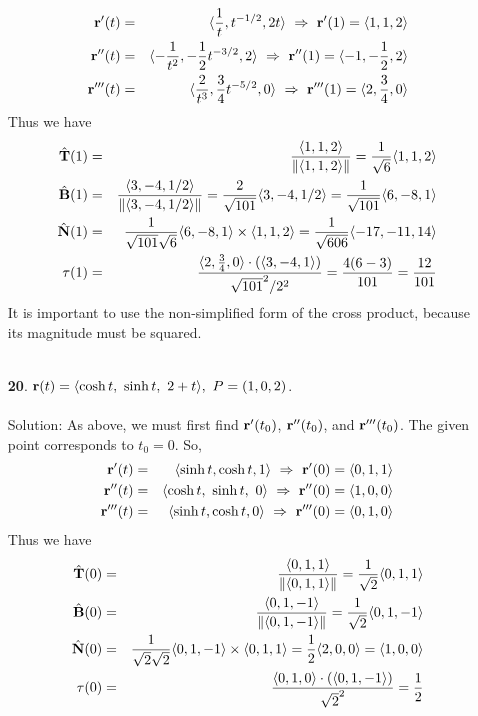 \documentclass[12pt]{amsbook}
\newcommand{\la}{\langle}
\newcommand{\ra}{\rangle}
\begin{document}
\begin{enumerate}
  \begin{eqnarray*}
  {\bf r}'(t)&=&\la \frac{1}{t},t^{-1/2},2t \ra \ \Rightarrow \ {\bf r}'(1)=\la 1,1,2 \ra \\
  {\bf r}''(t)&=&\la -\frac{1}{t^2},-\frac{1}{2}t^{-3/2},2 \ra \ \Rightarrow \ {\bf r}''(1)=\la -1,-\frac{1}{2},2 \ra \\
  {\bf r}'''(t)&=&\la \frac{2}{t^3},\frac{3}{4}t^{-5/2},0 \ra  \ \Rightarrow \ {\bf r}'''(1)=\la 2,\frac{3}{4},0 \ra
  \end{eqnarray*}
  Thus we have
  \begin{eqnarray*}
  \hat{\bf T}(1)&=&\frac{\la 1,1,2 \ra}{\|\la 1,1,2 \ra\|}=\frac{1}{\sqrt{6}}\la 1,1,2 \ra \\
  \hat{\bf B}(1)&=&\frac{\la 3,-4,1/2 \ra}{\|\la 3,-4,1/2 \ra\|}= \frac{2}{\sqrt{101}}\la 3,-4,1/2 \ra=\frac{1}{\sqrt{101}}\la 6,-8,1 \ra \\
  \hat{\bf N}(1)&=&\frac{1}{\sqrt{101}\sqrt{6}} \la 6,-8,1 \ra\times\la 1,1,2 \ra=\frac{1}{\sqrt{606}}\la -17,-11,14 \ra \\
  \tau(1)&=&\frac{\la 2,\frac{3}{4},0 \ra\cdot(\la 3,-4,1 \ra)}{\sqrt{101}^2/2^2}=\frac{4(6-3)}{101}=\frac{12}{101}
  \end{eqnarray*} 
  It is important to use the non-simplified form of the cross product, because its magnitude must be squared.
  \\
  \\
  \item[{\small\bf 20}.] ${\bf r}(t)=\la \cosh t,\ \sinh t,\ 2+t\ra, \ P=(1,0,2)$.
  \\
  \\
  {\sc Solution}: As above, we must first find ${\bf r}'(t_0)$, ${\bf r}''(t_0)$, and ${\bf r}'''(t_0)$. The given point corresponds to $t_0=0$. So,
  \begin{eqnarray*}
  {\bf r}'(t)&=& \la \sinh t, \cosh t, 1 \ra \ \Rightarrow \ {\bf r}'(0)=\la 0,1,1 \ra \\
  {\bf r}''(t)&=&\la \cosh t,\ \sinh t,\ 0\ra \ \Rightarrow \ {\bf r}''(0)=\la 1,0,0 \ra \\
  {\bf r}'''(t)&=&\la \sinh t, \cosh t, 0 \ra  \ \Rightarrow \ {\bf r}'''(0)=\la 0,1,0 \ra
  \end{eqnarray*}
  Thus we have
  \begin{eqnarray*}
  \hat{\bf T}(0)&=&\frac{\la 0,1,1 \ra}{\|\la 0,1,1 \ra\|}=\frac{1}{\sqrt{2}}\la 0,1,1 \ra \\
  \hat{\bf B}(0)&=&\frac{\la 0,1,-1 \ra}{\|\la 0,1,-1 \ra\|}= \frac{1}{\sqrt{2}}\la 0,1,-1 \ra \\
  \hat{\bf N}(0)&=&\frac{1}{\sqrt{2}\sqrt{2}} \la 0,1,-1 \ra\times\la 0,1,1 \ra=\frac{1}{2}\la 2,0,0 \ra=\la 1,0,0 \ra \\
  \tau(0)&=&\frac{\la 0,1,0 \ra\cdot(\la 0,1,-1 \ra)}{\sqrt{2}^2}=\frac{1}{2}
  \end{eqnarray*} 
\end{enumerate}
\end{document}
